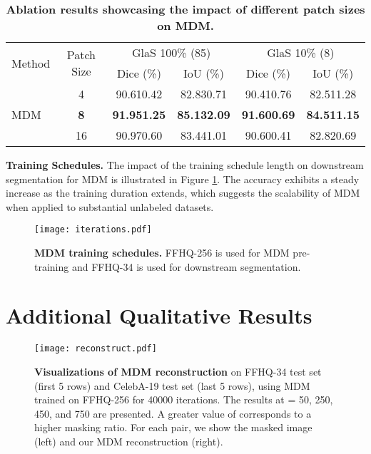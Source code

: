 \documentclass{article} \usepackage{iclr2024_conference,times}
\begin{document}
\begin{table*}[htp]
    \centering
    \caption{\textbf{Ablation results showcasing the impact of different patch sizes on MDM.}}
    \small \begin{tabular}{lccccc}
        \toprule
         \multirow{2}{*}{Method} &\multirow{2}{*}{Patch Size} & \multicolumn{2}{c}{GlaS 100\% (85)} &\multicolumn{2}{c}{GlaS 10\% (8)}\\
         \cmidrule(lr){3-4} \cmidrule(lr){5-6}
        && Dice (\%) & IoU (\%) &Dice (\%) &IoU (\%)\\
        \midrule
        \multirow{3}{*}{MDM} &4        &90.610.42 &82.830.71 &90.410.76  &82.511.28 \\
        &\textbf{8} &\textbf{91.951.25}  &\textbf{85.132.09} 
                   &\textbf{91.600.69}  &\textbf{84.511.15} \\
        &16       &90.970.60 &83.441.01 &90.600.41  &82.820.69 \\
        \bottomrule
    \end{tabular}
    \label{Patch_size}
\end{table*}


\textbf{Training Schedules.} 
The impact of the training schedule length on downstream segmentation for MDM is illustrated in Figure \ref{Training_schedule}. The accuracy exhibits a steady increase as the training duration extends, which suggests the scalability of MDM when applied to substantial unlabeled datasets.

\begin{figure}[!htp]
\centering
\texttt{[image: iterations.pdf]} \caption{\textbf{MDM training schedules.} FFHQ-256 is used for MDM pre-training and FFHQ-34 is used for downstream segmentation.}
\label{Training_schedule}
\end{figure}





\section{Additional Qualitative Results}
\begin{figure}[htbp]
\centering
\texttt{[image: reconstruct.pdf]} \caption{\textbf{ Visualizations of MDM reconstruction} on FFHQ-34 test set (first 5 rows) and CelebA-19 test set (last 5 rows), using MDM trained on FFHQ-256 for 40000 iterations. The results at  = 50, 250, 450, and 750 are presented. A greater value of  corresponds to a higher masking ratio. For each pair, we show the masked image (left) and our MDM reconstruction (right).}
\label{reconstruction}
\end{figure}
\end{document}
